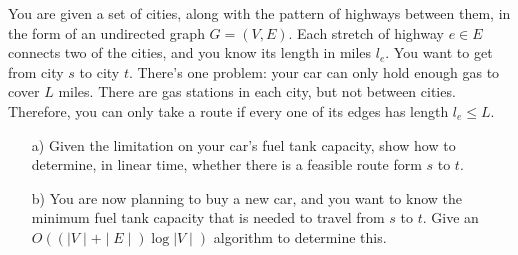 \documentclass{article}
\begin{document}


\begin{problem}

You are given a set of cities, along with the pattern of highways between them, in the form of an undirected graph $G=(V,E)$. Each stretch of highway $e\in E$ connects two of the cities, and you know its length in miles $l_e$. You want to get from city $s$ to city $t$. There's one problem: your car can only hold enough gas to cover $L$ miles. There are gas stations in each city, but not between cities. Therefore, you can only take a route if every one of its edges has length $l_e \leq L$.
\begin{itemize}
	\item[a)]{} Given the limitation on your car's fuel tank capacity, show how to determine, in linear time, whether there is a feasible route form $s$ to $t$.
	\item[b)]{} You are now planning to buy a new car, and you want to know the minimum fuel tank capacity that is needed to travel from $s$ to $t$.  Give an $O((\mid V \mid + \mid E \mid) \log {\mid V \mid})$ algorithm to determine this.
\end{itemize}
\end{problem}
\end{document}
